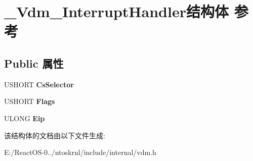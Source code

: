 \hypertarget{struct___vdm___interrupt_handler}{}\section{\+\_\+\+Vdm\+\_\+\+Interrupt\+Handler结构体 参考}
\label{struct___vdm___interrupt_handler}
\subsection*{Public 属性}
\begin{DoxyCompactItemize}
\item 
\mbox{\label{struct___vdm___interrupt_handler_a61a97d799ab2b6beb1772c3ed5f049c2}} 
U\+S\+H\+O\+RT {\bfseries Cs\+Selector}
\item 
\mbox{\label{struct___vdm___interrupt_handler_a27b2b1eecf73c61058b015d4f0cb5822}} 
U\+S\+H\+O\+RT {\bfseries Flags}
\item 
\mbox{\label{struct___vdm___interrupt_handler_a236cae3b9eafaed7ecc344340881b5a1}} 
U\+L\+O\+NG {\bfseries Eip}
\end{DoxyCompactItemize}


该结构体的文档由以下文件生成\+:\begin{DoxyCompactItemize}
\item 
E\+:/\+React\+O\+S-\/0../ntoskrnl/include/internal/vdm.\+h\end{DoxyCompactItemize}
